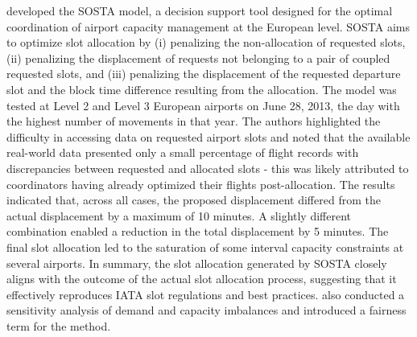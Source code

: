  developed the \acrfull{SOSTA} model, a
decision support tool designed for the optimal coordination of airport capacity
management at the European level.
%
\acrshort{SOSTA} aims to optimize slot allocation by (i) penalizing the
non-allocation of requested slots, (ii) penalizing the displacement of requests
not belonging to a pair of coupled requested slots, and (iii) penalizing the
displacement of the requested departure slot and the block time difference
resulting from the allocation.
%
The model was tested at Level 2 and Level 3 European airports on June 28, 2013,
the day with the highest number of movements in that year.
%
The authors highlighted the difficulty in accessing data on requested airport
slots and noted that the available real-world data presented only a small
percentage of flight records with discrepancies between requested and allocated
slots - this was likely attributed to coordinators having already optimized
their flights post-allocation.
%
The results indicated that, across all cases, the proposed displacement differed
from the actual displacement by a maximum of 10 minutes.
%
A slightly different combination enabled a reduction in the total displacement
by 5 minutes.
%
The final slot allocation led to the saturation of some interval capacity
constraints at several airports.
%
In summary, the slot allocation generated by \acrshort{SOSTA} closely aligns
with the outcome of the actual slot allocation process, suggesting that it
effectively reproduces IATA slot regulations and best practices.
%
 also conducted a sensitivity analysis of
demand and capacity imbalances and introduced a fairness term for the method.



